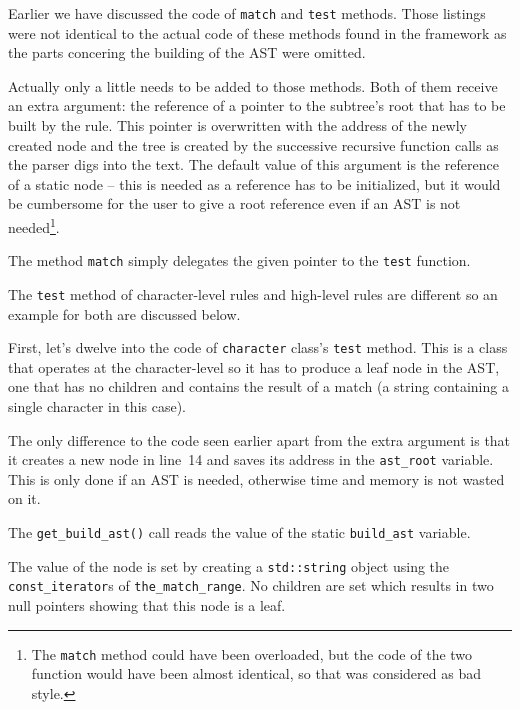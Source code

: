 \documentclass[12pt]{article}
\begin{document}
Earlier we have discussed the code of \texttt{match} and \texttt{test} methods. Those listings were not
identical to the actual code of these methods found in the framework as the parts concering the building of
the AST were omitted.

Actually only a little needs to be added to those methods. Both of them receive an extra argument: the
reference of a pointer to the subtree's root that has to be built by the rule. This pointer is overwritten
with the address of the newly created node and the tree is created by the successive recursive function calls
as the parser digs into the text. The default value of this argument is the reference of a static node -- this
is needed as a reference has to be initialized, but it would be cumbersome for the user to give a root
reference even if an AST is not needed\footnote{The \texttt{match} method could have been overloaded, but the
code of the two function would have been almost identical, so that was considered as bad style.}.

The method \texttt{match} simply delegates the given pointer to the \texttt{test} function.

The \texttt{test} method of character-level rules and high-level rules are different so an example for both
are discussed below.

First, let's dwelve into the code of \texttt{character} class's \texttt{test} method. This is a class that
operates at the character-level so it has to produce a leaf node in the AST, one that has no children and
contains the result of a match (a string containing a single character in this case).

The only difference to the code seen earlier apart from the extra argument is that it creates a new node in
line~14 and saves its address in the \texttt{ast\_root} variable. This is only done if an AST is needed,
otherwise time and memory is not wasted on it.

The \texttt{get\_build\_ast()} call reads the value of the static \texttt{build\_ast} variable.

The value of the node is set by creating a \texttt{std::string} object using the \texttt{const\_iterator}s
of \texttt{the\_match\_range}. No children are set which results in two null pointers showing that this node
is a leaf.
\end{document}
